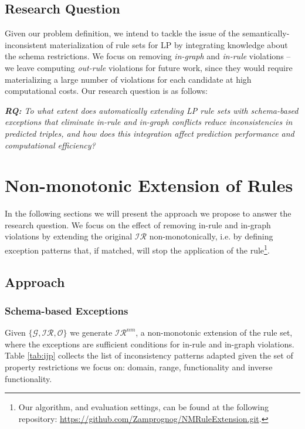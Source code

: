 \documentclass[a4paper,UKenglish,cleveref, autoref, thm-restate]{tgdk-v2021}
\begin{document}
\subsection{Research Question}

Given our problem definition, we intend to tackle the issue of the semantically-inconsistent materialization of rule sets for LP by integrating knowledge about the schema restrictions. 
We focus on removing \textit{in-graph} and \textit{in-rule} violations -- we leave computing \textit{out-rule} violations for future work, since they would require materializing a large number of violations for each candidate at high computational costs. Our research question is as follows: 

\textit{\textbf{RQ:} To what extent does automatically extending LP rule sets with schema-based exceptions that eliminate in-rule and in-graph conflicts reduce inconsistencies in predicted triples, and how does this integration affect prediction performance and computational efficiency?}

\section{Non-monotonic Extension of Rules}
In the following sections we will present the approach we propose to answer the research question. We focus on the effect of removing in-rule and in-graph violations by extending the original $\mathcal{IR}$ non-monotonically, i.e. by defining exception patterns that, if matched, will stop the application of the rule\footnote{Our algorithm, and evaluation settings, can be found at the following repository: \url{https://github.com/Zamprognog/NMRuleExtension.git}.}. 


\subsection{Approach} \label{sec:approach}
\subsubsection{Schema-based Exceptions} Given $\{\mathcal{G,IR,O}\}$ we generate $\mathcal{IR}^{nm}$, a non-monotonic extension of the rule set, where the exceptions are sufficient conditions for in-rule and in-graph violations. Table \ref{tab:ijp} collects the list of inconsistency patterns adapted given the set of property restrictions we focus on: domain, range, functionality and
inverse functionality. 
\end{document}
